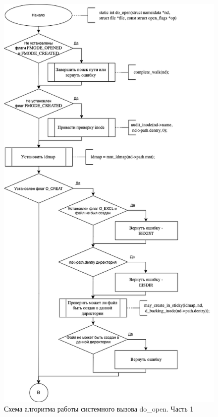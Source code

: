 \documentclass[12pt]{report}
\begin{document}
\begin{figure}[h!]
	\centering
	\includegraphics[scale=0.5]{do_open1.png}
	\caption{Схема алгоритма работы системного вызова do\_open. Часть 1}
	\label{png:testing:result}
\end{figure}
\end{document}

